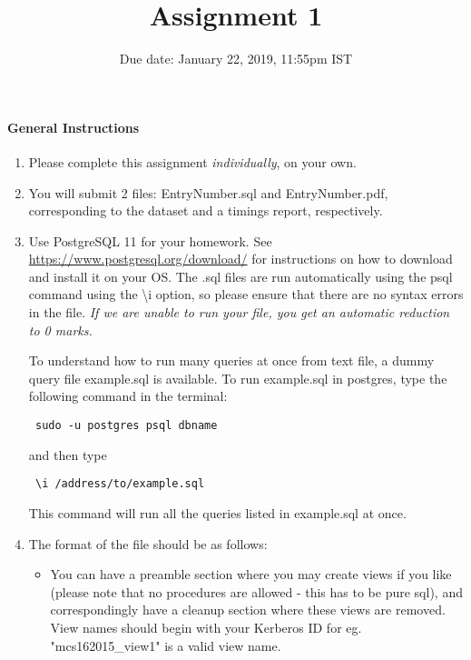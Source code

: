 \documentclass[10pt]{article}
\title{Assignment 1}
\date{Due date: January 22, 2019, 11:55pm IST}
\begin{document}
\maketitle
\paragraph*{General Instructions}


\begin{enumerate}

\item Please complete this assignment \emph{individually}, on your own.

\item You will submit 2 files: EntryNumber.sql and EntryNumber.pdf, corresponding to the dataset and a timings report, respectively.

\item Use PostgreSQL 11 for your homework. See \url{https://www.postgresql.org/download/} for instructions
on how to download and install it on your OS. The .sql files are run automatically using the psql command using the \textbackslash i option, so please ensure that there are no syntax errors in the file. {\it If we are unable to run your file, you get an automatic reduction to 0 marks.}


To understand how to run many queries at once from text file, a dummy query file example.sql is available. To run example.sql in postgres, type the following command in the terminal:

\begin{verbatim} sudo -u postgres psql dbname \end{verbatim}

    and then type

\begin{verbatim} \i /address/to/example.sql \end{verbatim}

This command will run all the queries listed in example.sql at once.

\item The format of the file should be as follows:

\begin{itemize}
    \item You can have a preamble section where you may create views if you like (please note that no procedures are allowed - this has to be pure sql), and correspondingly have a cleanup section where these views are removed. View names should begin with your Kerberos ID for eg. "mcs162015\_view1" is a valid view name.


\end{itemize}
\end{enumerate}
\end{document}

